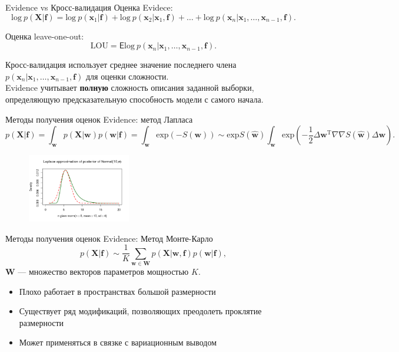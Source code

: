 \documentclass[10pt,pdf,utf8,russian,aspectratio=169]{beamer}
\begin{document}
\begin{frame}{Evidence vs Кросс-валидация}
Оценка Evidece:
\[
\text{log}~p(\mathbf{X}|\mathbf{f}) = \text{log}~p(\mathbf{x}_1|\mathbf{f}) + \text{log}~p(\mathbf{x}_2|\mathbf{x}_1, \mathbf{f}) + \dots +  \text{log}~p(\mathbf{x}_n|\mathbf{x}_1,\dots,\mathbf{x}_{n-1}, \mathbf{f}).
\]

Оценка leave-one-out:
\[
\text{LOU} = \mathsf{E} \text{log}~p(\mathbf{x}_n|\mathbf{x}_1,\dots,\mathbf{x}_{n-1}, \mathbf{f}).
\]

Кросс-валидация использует среднее значение последнего члена $p(\mathbf{x}_n|\mathbf{x}_1,\dots,\mathbf{x}_{n-1}, \mathbf{f})$ для оценки сложности. \\
Evidence учитывает \textbf{полную} сложность описания заданной выборки, определяющую предсказательную способность модели с самого начала.
\end{frame}

\begin{frame}{Методы получения оценок Evidence: метод Лапласа}
$$
	p(\mathbf{X}|\mathbf{f}) = \int_\mathbf{w} p(\mathbf{X}|\mathbf{w}) p(\mathbf{w}|\mathbf{f}) = \int_\mathbf{w} \text{exp}(-S(\mathbf{w}))	\sim  \text{exp}S(\hat{\mathbf{w}}) \int_\mathbf{w} \text{exp} (-\frac{1}{2}\Delta \mathbf{w}^\text{T} \nabla \nabla S(\hat{\mathbf{w}}) \Delta \mathbf{w} ).
$$

\begin{figure}
  \centering
 \includegraphics[width=0.4\textwidth]{laplace2.png}
\label{fig:1}\qquad	
\end{figure}

\end{frame}
\begin{frame}{Методы получения оценок Evidence: Метод Монте-Карло}
$$
p(\mathbf{X}|\mathbf{f})  \sim \frac{1}{K}\sum_{\mathbf{w} \in \mathbf{W}} p(\mathbf{X}|\mathbf{w},\mathbf{f})p(\mathbf{w}|\mathbf{f}),
$$
$\mathbf{W}$ --- множество векторов параметров мощностью $K$.

\begin{itemize}
\item Плохо работает в пространствах большой размерности
\item Существует ряд модификаций, позволяющих преодолеть проклятие размерности
\item Может применяться в связке с вариационным выводом
\end{itemize}
\end{frame}
\end{document}
